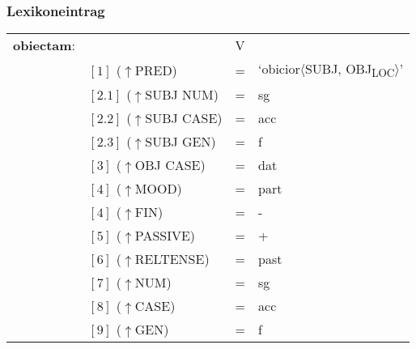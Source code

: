 \documentclass[12pt,a4paper]{article}
\begin{document}
\subsubsection{Lexikoneintrag}
\begin{singlespace}
\begin{tabular}{ l  l  l  l  } 
\textbf{obiectam}: &  & V \\
$\qquad$ & $[1]$ \:  ($\uparrow$PRED) & = & `obicior$\langle$SUBJ, OBJ\textsubscript{LOC}$\rangle$'\\
$\qquad$ & $[2.1]$ \:  ($\uparrow$SUBJ NUM) & = & sg \\
$\qquad$ & $[2.2]$ \: ($\uparrow$SUBJ CASE) & = & acc \\
$\qquad$ & $[2.3]$ \: ($\uparrow$SUBJ GEN) & = & f \\
$\qquad$ & $[3]$ \: ($\uparrow$OBJ CASE) & = & dat \\
$\qquad$ & $[4]$ \:  ($\uparrow$MOOD) & = & part\\
$\qquad$ & $[4]$ \:  ($\uparrow$FIN) & = & - \\
$\qquad$ & $[5]$ \:  ($\uparrow$PASSIVE) & = & + \\
$\qquad$ & $[6]$ \:  ($\uparrow$RELTENSE) & = & past \\
$\qquad$ & $[7]$ \:  ($\uparrow$NUM) & = & sg \\
$\qquad$ & $[8]$ \: ($\uparrow$CASE) & = & acc \\
$\qquad$ & $[9]$ \: ($\uparrow$GEN) & = & f \\
\end{tabular}
\newline
\end{singlespace}
\end{document}
